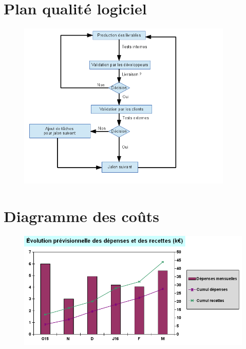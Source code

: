 \documentclass{beamer}
\begin{document}

\section{Plan qualit\'e logiciel}
	\begin{frame}{\secname}
		\begin{figure}
			\includegraphics[height=8cm]{../Lancement/ImagesLancement/PAQL.png}
		\end{figure}
	\end{frame}




\section{Diagramme des coûts}

\begin{frame}{\secname}
	\begin{figure}
		\includegraphics[width=12cm]{../Lancement/ImagesLancement/Cout2.png}
	\end{figure}
\end{frame}
\end{document}
